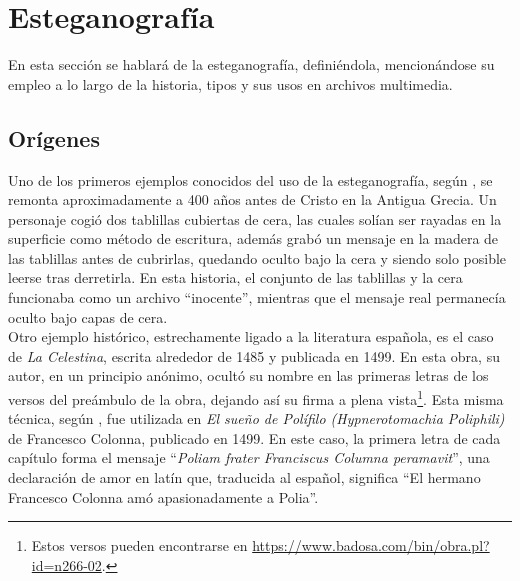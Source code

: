 \section{Esteganografía}

En esta sección se hablará de la esteganografía, definiéndola, mencionándose su empleo a lo largo de la historia, tipos y sus usos en archivos multimedia.

\subsection{Orígenes}

Uno de los primeros ejemplos conocidos del uso de la esteganografía, según \cite{salas2015}, se remonta  aproximadamente a 400 años antes de Cristo en la Antigua Grecia. Un personaje cogió dos tablillas cubiertas de cera, las cuales solían ser rayadas en la superficie como método de escritura, además grabó un mensaje en la madera de las tablillas antes de cubrirlas, quedando oculto bajo la cera y siendo solo posible leerse tras derretirla. En esta historia, el conjunto de las tablillas y la cera funcionaba como un archivo ``inocente'', mientras que el mensaje real permanecía oculto bajo capas de cera.\\



Otro ejemplo histórico, estrechamente ligado a la literatura española, es el caso de \textit{La Celestina}, escrita alrededor de 1485 y publicada en 1499. En esta obra, su autor, en un principio anónimo, ocultó su nombre en las primeras letras de los versos del preámbulo de la obra, dejando así su firma a plena vista\footnote{Estos versos pueden encontrarse en \url{https://www.badosa.com/bin/obra.pl?id=n266-02}.}.
Esta misma técnica, según \cite{salas2015}, fue utilizada en \textit{El sueño de Polífilo (Hypnerotomachia Poliphili)} de Francesco Colonna, publicado en 1499. En este caso, la primera letra de cada capítulo forma el mensaje ``\textit{Poliam frater Franciscus Columna peramavit}'', una declaración de amor en latín que, traducida al español, significa ``El hermano Francesco Colonna amó apasionadamente a Polia''.\\

